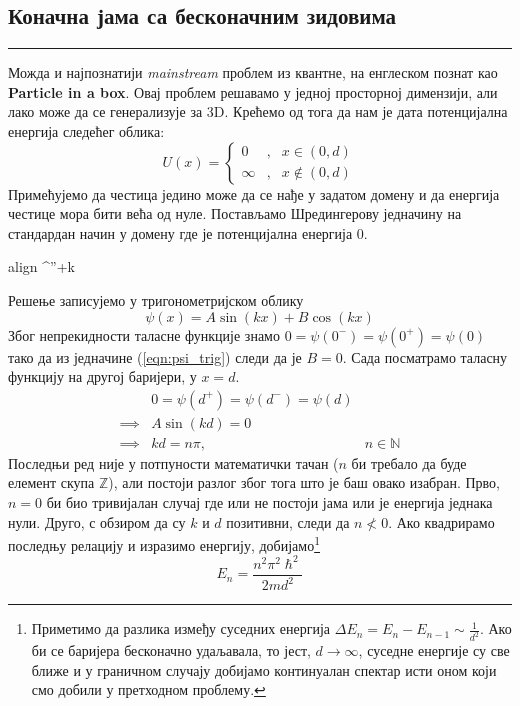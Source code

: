 \documentclass{tufte-handout} %
\newcommand{\boxedeq}[1]{\begin{empheq}[box={\fboxsep=6pt\fbox}]{align} #1\end{empheq}}
\theoremstyle{definition}
\theoremstyle{remark}
\newcommand{\N}{\mathbb{N}}
\newcommand{\Z}{\mathbb{Z}}
\newcommand{\kpsi}{\psi^{''}+k\psi=0}
\newcommand{\hb}{\hslash}
\begin{document}
\subsection*{Коначна јама са бесконачним зидовима}
\hrule
\vspace{1em}
Можда и најпознатији \textsf{\textit{mainstream}} проблем из квантне, на енглеском познат као \textbf{Particle in a box}. Овај проблем решавамо у једној просторној димензији, али лако може да се генерализује за 3D. Крећемо од тога да нам је дата потенцијална енергија следећег облика:
\begin{equation}
	U(x) = \left\{ \begin{array}{rcl}
		0 & \mbox{,}
		& x\in(0,d) \\ 
		\infty & \mbox{,} & x\notin(0,d)
	\end{array}\right.
\end{equation}
Примећујемо да честица једино може да се нађе у задатом домену и да енергија честице мора бити већа од нуле. Постављамо Шредингерову једначину на стандардан начин у домену где је потенцијална енергија 0.
\boxedeq{\kpsi}
Решење записујемо у тригонометријском облику
\begin{equation}\label{eqn:psi_trig}
	\psi(x) = A\sin(kx) + B\cos(kx)
\end{equation}
Због непрекидности таласне функције знамо $0=\psi(0^-)=\psi(0^+)=\psi(0)$ тако да из једначине (\ref{eqn:psi_trig}) следи да је $B=0$. Сада посматрамо таласну функцију на другој баријери, у $x=d$.
\begin{align*}
	&0=\psi(d^+)=\psi(d^-)=\psi(d)&\\
	\implies &A\sin(kd) = 0&\\
	\implies &kd = n\pi,&n\in\N
\end{align*}
Последњи ред није у потпуности математички тачан ($n$ би требало да буде елемент скупа $\Z$), али постоји разлог због тога што је баш овако изабран. Прво, $n=0$ би био тривијалан случај где или не постоји јама или је енергија једнака нули. Друго, с обзиром да су $k$ и $d$ позитивни, следи да $n\nless0$. Ако квадрирамо последњу релацију и изразимо енергију, добијамо\footnote{Приметимо да разлика између суседних енергија $\Delta E_n = E_n - E_{n-1}\sim \frac{1}{d^2}$. Ако би се баријера бесконачно удаљавала, то јест, $d\rightarrow\infty$, суседне енергије су све ближе и у граничном случају добијамо континуалан спектар исти оном који смо добили у претходном проблему.}
\begin{equation}\label{eqn:energija_kvantne_jame}
	E_n = \frac{n^2\pi^2\hb^2}{2md^2}
\end{equation}
\end{document}
